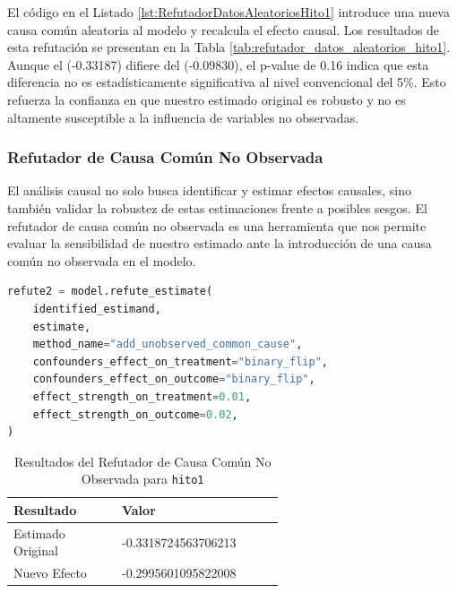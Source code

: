 El código en el Listado \ref{lst:RefutadorDatosAleatoriosHito1} introduce una nueva causa común aleatoria al modelo y recalcula el efecto causal. Los resultados de esta refutación se presentan en la Tabla \ref{tab:refutador_datos_aleatorios_hito1}. Aunque el  (-0.33187) difiere del  (-0.09830), el p-value de 0.16 indica que esta diferencia no es estadísticamente significativa al nivel convencional del 5\%. Esto refuerza la confianza en que nuestro estimado original es robusto y no es altamente susceptible a la influencia de variables no observadas.



\subsubsection{Refutador de Causa Común No Observada}

El análisis causal no solo busca identificar y estimar efectos causales, sino también validar la robustez de estas estimaciones frente a posibles sesgos. El refutador de causa común no observada es una herramienta que nos permite evaluar la sensibilidad de nuestro estimado ante la introducción de una causa común no observada en el modelo.

\begin{minipage}{0.5\textwidth}
    \begin{lstlisting}[language=Python, caption=Refutador de causa común no observada para \texttt{hito1}, label=lst:RefutadorCausaComúnNoObservadaHito1]
refute2 = model.refute_estimate(
    identified_estimand,
    estimate,
    method_name="add_unobserved_common_cause",
    confounders_effect_on_treatment="binary_flip",
    confounders_effect_on_outcome="binary_flip",
    effect_strength_on_treatment=0.01,
    effect_strength_on_outcome=0.02,
)
\end{lstlisting}
\end{minipage}
\hfill
\begin{minipage}{0.45\textwidth}
    \begin{table}[H]
        \centering
        \begin{tabular}{lp{0.6\linewidth}}
            \toprule
            \textbf{Resultado} & \textbf{Valor} \\
            \midrule
            Estimado Original & -0.3318724563706213 \\
            Nuevo Efecto & -0.2995601095822008 \\
            \bottomrule
        \end{tabular}
        \caption{Resultados del Refutador de Causa Común No Observada para \texttt{hito1}}
        \label{tab:refutador_causa_no_observada_hito1}
    \end{table}
\end{minipage}

